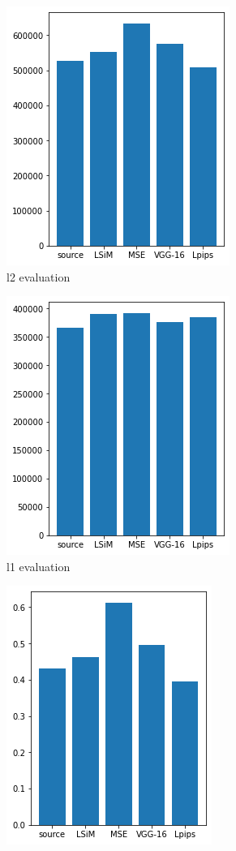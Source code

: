 \documentclass[a4paper,12pt,twoside]{report}
\begin{document}
\begin{figure}
	\centering
	\begin{subfigure}{0.32\textwidth}
		\centering
		\includegraphics[scale=0.48]{buoyancy_test/l2.png}
		\caption{l2 evaluation}
	\end{subfigure}
	\begin{subfigure}{0.32\textwidth}
		\centering
		\includegraphics[scale=0.48]{buoyancy_test/l1.png}
		\caption{l1 evaluation}
	\end{subfigure}
	\begin{subfigure}{0.32\textwidth}
		\centering
		\includegraphics[scale=0.48]{buoyancy_test/mse.png}

\end{subfigure}
\end{figure}
\end{document}
